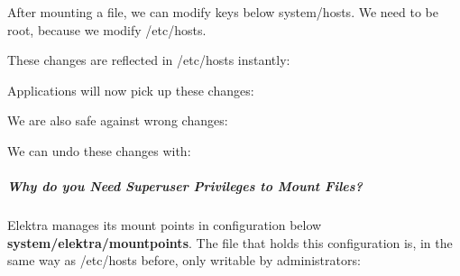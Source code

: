 \begin{DoxyCode}{0}
\end{DoxyCode}


After mounting a file, we can modify keys below {\ttfamily system/hosts}. We need to be root, because we modify {\ttfamily /etc/hosts}.


\begin{DoxyCode}{0}
\end{DoxyCode}


These changes are reflected in {\ttfamily /etc/hosts} instantly\+:


\begin{DoxyCode}{0}
\end{DoxyCode}


Applications will now pick up these changes\+:


\begin{DoxyCode}{0}
\end{DoxyCode}


We are also safe against wrong changes\+:


\begin{DoxyCode}{0}
\end{DoxyCode}


We can undo these changes with\+:


\begin{DoxyCode}{0}
\DoxyCodeLine{}
\end{DoxyCode}


\subparagraph*{Why do you Need Superuser Privileges to Mount Files?}

Elektra manages its mount points in configuration below {\bfseries{system/elektra/mountpoints}}. The file that holds this configuration is, in the same way as {\ttfamily /etc/hosts} before, only writable by administrators\+:


\begin{DoxyCode}{0}
\end{DoxyCode}


